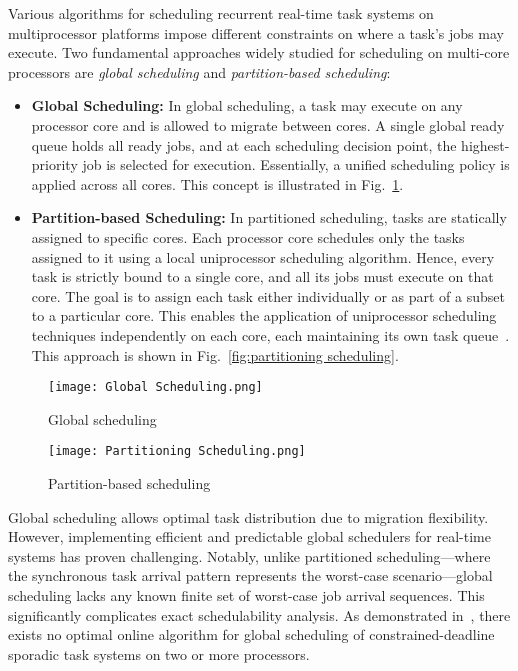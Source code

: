 \documentclass[conference]{IEEEtran}
\begin{document}
Various algorithms for scheduling recurrent real-time task systems on multiprocessor platforms impose different constraints on where a task's jobs may execute. Two fundamental approaches widely studied for scheduling on multi-core processors are \textit{global scheduling} and \textit{partition-based scheduling}:

\begin{itemize}
    \item \textbf{Global Scheduling:} In global scheduling, a task may execute on any processor core and is allowed to migrate between cores. A single global ready queue holds all ready jobs, and at each scheduling decision point, the highest-priority job is selected for execution. Essentially, a unified scheduling policy is applied across all cores. This concept is illustrated in Fig.~\ref{fig:global scheduling}.
    
    \item \textbf{Partition-based Scheduling:} In partitioned scheduling, tasks are statically assigned to specific cores. Each processor core schedules only the tasks assigned to it using a local uniprocessor scheduling algorithm. Hence, every task is strictly bound to a single core, and all its jobs must execute on that core. The goal is to assign each task either individually or as part of a subset to a particular core. This enables the application of uniprocessor scheduling techniques independently on each core, each maintaining its own task queue~\cite{AbdallahGB24}. This approach is shown in Fig.~\ref{fig:partitioning scheduling}.
\end{itemize}

\begin{figure}[h!]
    \centering
    \texttt{[image: Global Scheduling.png]}
    \caption{Global scheduling \cite{AbdallahGB24}}
    \label{fig:global scheduling}
\end{figure}

\begin{figure}[h!]
    \centering
    \texttt{[image: Partitioning Scheduling.png]}
    \caption{Partition-based scheduling \cite{AbdallahGB24}}
    \label{fig:partitioning scheduling }
\end{figure}

Global scheduling allows optimal task distribution due to migration flexibility. However, implementing efficient and predictable global schedulers for real-time systems has proven challenging. Notably, unlike partitioned scheduling—where the synchronous task arrival pattern represents the worst-case scenario—global scheduling lacks any known finite set of worst-case job arrival sequences. This significantly complicates exact schedulability analysis. As demonstrated in~\cite{sbmbgb}, there exists no optimal online algorithm for global scheduling of constrained-deadline sporadic task systems on two or more processors.
\end{document}
